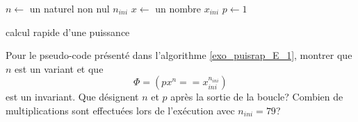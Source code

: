 \begin{algorithm}
  $n \leftarrow$ un naturel non nul $n_{ini}$\;
  $x \leftarrow $ un nombre $x_{ini}$\;
  $p \leftarrow 1$\;
  \caption{calcul rapide d'une puissance}
  \label{exo_puisrap_E_1}
\end{algorithm}
Pour le pseudo-code présenté dans l'algorithme \ref{exo_puisrap_E_1}, montrer que $n$ est un variant et que 
\begin{displaymath}
  \Phi = \left( px^n == x_{ini}^{n_{ini}} \right) 
\end{displaymath}
est un invariant. Que désignent $n$ et $p$ après la sortie de la boucle? Combien de multiplications sont effectuées lors de l'exécution avec $n_{ini} = 79$?